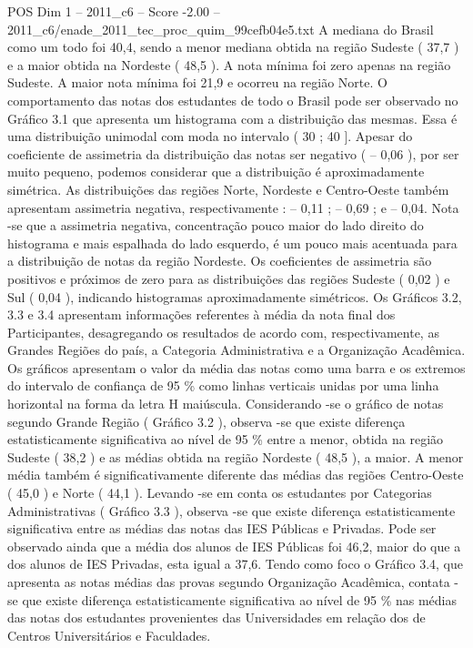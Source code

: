 \begin{textsample}{POS Dim 1 – 2011\_c6 – Score -2.00 – 2011\_c6/enade\_2011\_tec\_proc\_quim\_99cefb04e5.txt}
A mediana do Brasil como um todo foi 40,4, sendo a menor mediana obtida na região Sudeste ( 37,7 ) e a maior obtida na Nordeste ( 48,5 ).
A nota mínima foi zero apenas na região Sudeste.
A maior nota mínima foi 21,9 e ocorreu na região Norte.
O comportamento das notas dos estudantes de todo o Brasil pode ser observado no Gráfico 3.1 que apresenta um histograma com a distribuição das mesmas.
Essa é uma distribuição unimodal com moda no intervalo ( 30 ; 40 ].
Apesar do coeficiente de assimetria da distribuição das notas ser negativo ( – 0,06 ), por ser muito pequeno, podemos considerar que a distribuição é aproximadamente simétrica.
As distribuições das regiões Norte, Nordeste e Centro-Oeste também apresentam assimetria negativa, respectivamente : – 0,11 ; – 0,69 ; e – 0,04.
Nota -se que a assimetria negativa, concentração pouco maior do lado direito do histograma e mais espalhada do lado esquerdo, é um pouco mais acentuada para a distribuição de notas da região Nordeste.
Os coeficientes de assimetria são positivos e próximos de zero para as distribuições das regiões Sudeste ( 0,02 ) e Sul ( 0,04 ), indicando histogramas aproximadamente simétricos.
Os Gráficos 3.2, 3.3 e 3.4 apresentam informações referentes à média da nota final dos Participantes, desagregando os resultados de acordo com, respectivamente, as Grandes Regiões do país, a Categoria Administrativa e a Organização Acadêmica.
Os gráficos apresentam o valor da média das notas como uma barra e os extremos do intervalo de confiança de 95 \% como linhas verticais unidas por uma linha horizontal na forma da letra H maiúscula.
Considerando -se o gráfico de notas segundo Grande Região ( Gráfico 3.2 ), observa -se que existe diferença estatisticamente significativa ao nível de 95 \% entre a menor, obtida na região Sudeste ( 38,2 ) e as médias obtida na região Nordeste ( 48,5 ), a maior.
A menor média também é significativamente diferente das médias das regiões Centro-Oeste ( 45,0 ) e Norte ( 44,1 ).
Levando -se em conta os estudantes por Categorias Administrativas ( Gráfico 3.3 ), observa -se que existe diferença estatisticamente significativa entre as médias das notas das IES Públicas e Privadas.
Pode ser observado ainda que a média dos alunos de IES Públicas foi 46,2, maior do que a dos alunos de IES Privadas, esta igual a 37,6.
Tendo como foco o Gráfico 3.4, que apresenta as notas médias das provas segundo Organização Acadêmica, contata -se que existe diferença estatisticamente significativa ao nível de 95 \% nas médias das notas dos estudantes provenientes das Universidades em relação dos de Centros Universitários e Faculdades.

\end{textsample}
